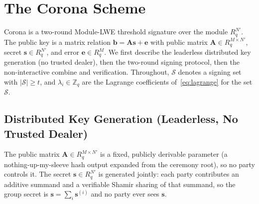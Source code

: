 \section{The Corona Scheme}

\label{sec:scheme}

Corona is a two-round Module-LWE threshold signature over the module $R_q^{N'}$. The
public key is a matrix relation $\mathbf{b} = \mathbf{A}\mathbf{s} + \mathbf{e}$ with
public matrix $\mathbf{A} \in R_q^{M \times N'}$, secret $\mathbf{s} \in R_q^{N'}$, and
error $\mathbf{e} \in R_q^{M}$. We first describe the leaderless distributed key
generation (no trusted dealer), then the two-round signing protocol, then the
non-interactive combine and verification. Throughout, $\mathcal{S}$ denotes a signing
set with $|\mathcal{S}| \ge t$, and $\lambda_i \in \mathbb{Z}_q$ are the Lagrange
coefficients of~\eqref{eq:lagrange} for the set $\mathcal{S}$.

\subsection{Distributed Key Generation (Leaderless, No Trusted Dealer)}

The public matrix $\mathbf{A} \in R_q^{M \times N'}$ is a fixed, publicly derivable
parameter (a nothing-up-my-sleeve hash output expanded from the ceremony root), so no
party controls it. The secret $\mathbf{s} \in R_q^{N'}$ is generated jointly: each party
contributes an additive summand and a verifiable Shamir sharing of that summand, so the
group secret is $\mathbf{s} = \sum_{i} \mathbf{s}^{(i)}$ and no party ever sees
$\mathbf{s}$.

